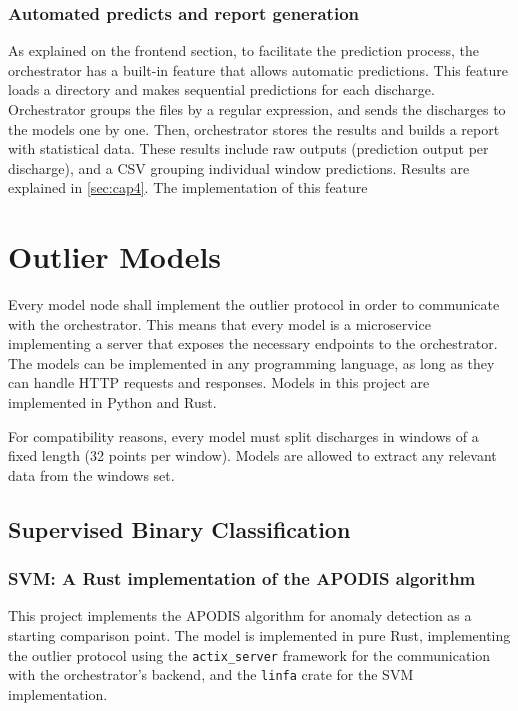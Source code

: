 \subsubsection{Automated predicts and report generation}

As explained on the frontend section, to facilitate the prediction process, the orchestrator has a built-in feature that allows automatic predictions. This feature loads a directory and makes sequential predictions for each discharge. Orchestrator groups the files by a regular expression, and sends the discharges to the models one by one. Then, orchestrator stores the results and builds a report with statistical data. These results include raw outputs (prediction output per discharge), and a CSV grouping individual window predictions. Results are explained in \autoref{sec:cap4}. The implementation of this feature

\section{Outlier Models}\label{sec:models}

Every model node shall implement the outlier protocol in order to communicate with the orchestrator. This means that every model is a microservice implementing a server that exposes the necessary endpoints to the orchestrator. The models can be implemented in any programming language, as long as they can handle HTTP requests and responses. Models in this project are implemented in Python and Rust.

For compatibility reasons, every model must split discharges in windows of a fixed length (32 points per window). Models are allowed to extract any relevant data from the windows set.

\subsection{Supervised Binary Classification}

\subsubsection{\acs{SVM}: A Rust implementation of the \acs{APODIS} algorithm}\label{sec:svm}

This project implements the \ac{APODIS} algorithm for anomaly detection as a starting comparison point. The model is implemented in pure Rust, implementing the outlier protocol using the \texttt{actix\_server} framework for the communication with the orchestrator's backend, and the \texttt{linfa} crate for the \ac{SVM} implementation. 

